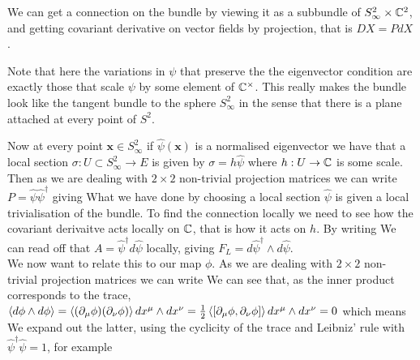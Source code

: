 \documentclass{article}
\begin{document}
\begin{enumerate}
We can get a connection on the bundle by viewing it as a subbundle of $S_\infty^2 \times \mbb{C}^2$, and getting covariant derivative on vector fields by projection, that is $DX = PdX$.
\begin{remark}
	Note that here the variations in $\psi$ that preserve the the eigenvector condition are exactly those that scale $\psi$ by some element of $\mbb{C}^\times$. This really makes the bundle look like the tangent bundle to the sphere $S_\infty^2$ in the sense that there is a plane attached at every point of $S^2$. 
\end{remark} 
Now at every point $\bm{x} \in S_\infty^2$ if $\hat{\psi}(\bm{x})$ is a normalised eigenvector we have that a local section $\sigma : U \subset S_\infty^2 \to E$ is given by $\sigma = h \hat{\psi}$ where $h:U \to \mbb{C}$ is some scale. Then as we are dealing with $2\times 2$ non-trivial projection matrices we can write $P = \hat{\psi} \hat{\psi}^\dagger$ giving 
What we have done by choosing a local section $\hat{\psi}$ is given a local trivialisation of the bundle. To find the connection locally we need to see how the covariant derivaitve acts locally on $\mbb{C}$, that is how it acts on $h$. By writing 
We can read off that $A = \hat{\psi}^\dagger d\hat{\psi}$ locally, giving $F_L = d\hat{\psi}^\dagger \wedge d\hat{\psi}$. \\
We now want to relate this to our map $\phi$. As we are dealing with $2\times 2$ non-trivial projection matrices we can write 
We can see that, as the inner product corresponds to the trace, $\pangle{d\phi \wedge d\phi} = \pangle{(\del_\mu \phi)(\del_\nu \phi)} dx^\mu \wedge dx^\nu = \frac{1}{2}\pangle{\comm[\del_\mu \phi]{\del_\nu \phi}} dx^\mu \wedge dx^\nu = 0$ which means 
We expand out the latter, using the cyclicity of the trace and Leibniz' rule with $\hat{\psi}^\dagger \hat{\psi}=1$, for example

\end{enumerate}
\end{document}
